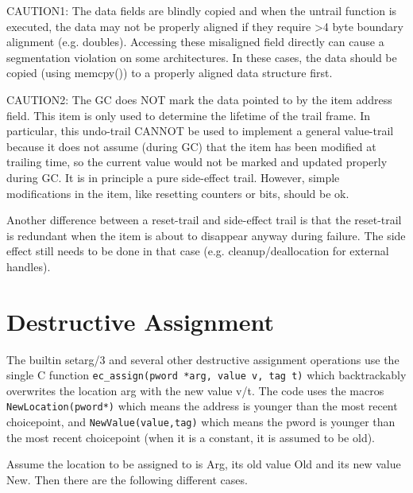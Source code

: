 CAUTION1: The data fields are blindly copied and when the untrail
function is executed, the data may not be properly aligned if they
require >4 byte boundary alignment  (e.g. doubles). Accessing these
misaligned field directly can cause a segmentation violation on some
architectures. In these cases, the data should be copied (using memcpy()) 
to a properly aligned data structure first.

CAUTION2:  The GC does NOT mark the data pointed to by the item
address field.  This item is only used to determine the lifetime
of the trail frame.  In particular, this undo-trail CANNOT be used
to implement a general value-trail because it does not assume
(during GC) that the item has been modified at trailing time, so
the current value would not be marked and updated properly during
GC.  It is in principle a pure side-effect trail.  However, simple
modifications in the item, like resetting counters or bits, should
be ok.

Another difference between a reset-trail and side-effect trail is that
the reset-trail is redundant when the item is about to disappear anyway
during failure. The side effect still needs to be done in that case
(e.g. cleanup/deallocation for external handles).


\section{Destructive Assignment}

The builtin setarg/3 and several other destructive assignment operations
use the single C function \verb.ec_assign(pword *arg, value v, tag t).
which backtrackably overwrites the location arg with the new value v/t.
The code uses the macros \verb.NewLocation(pword*).
which means the address is younger than the most recent choicepoint,
and \verb.NewValue(value,tag).
which means the pword is younger than the most recent choicepoint
(when it is a constant, it is assumed to be old).

Assume the location to be assigned to is Arg, its old value Old and
its new value New.  Then there are the following different cases.

